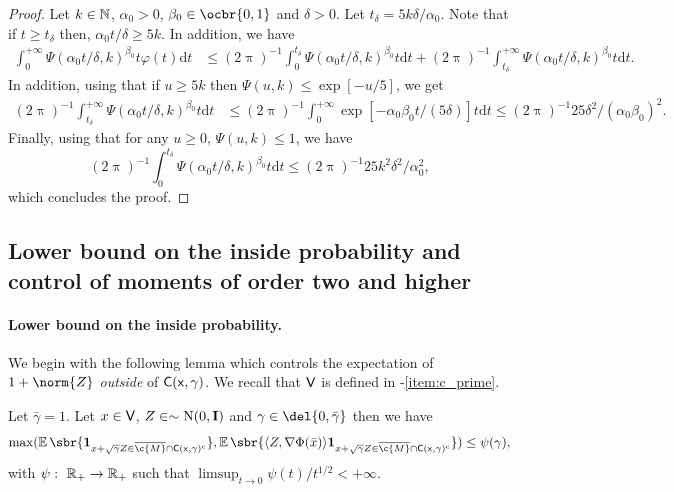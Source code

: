 \begin{proof}
	Let $k \in \mathbb{N}$, $\alpha_0 >0$, $\beta_0 \in \ocbr{0,1}$ and $\delta > 0$.
	Let $t_{\delta} = 5 k \delta /\alpha_0$.
	Note that if $t \geq t_\delta$ then, $\alpha_0 t /\delta \geq 5k$.
	In addition, we have \begin{align} \textstyle{ \int_0^{+\infty} \Psi(\alpha_0 t/\delta, k)^{\beta_0} t \varphi(t) \mathrm{d} t} & \leq (2 \uppi)^{-1} \textstyle{ \int_0^{t_\delta} \Psi(\alpha_0 t/\delta, k)^{\beta_0} t \mathrm{d} t} + (2\uppi)^{-1} \textstyle{ \int_{t_\delta}^{+\infty} \Psi(\alpha_0 t/\delta, k)^{\beta_0} t \mathrm{d} t} .
	\end{align}
	In addition, using that if $u \geq 5k$ then $\Psi(u,k) \leq \exp[-u/5]$, we get \begin{align} \textstyle (2\uppi)^{-1} \int_{t_\delta}^{+\infty} \Psi(\alpha_0 t/\delta, k)^{\beta_0} t \mathrm{d} t & \leq (2\uppi)^{-1} \textstyle \int_0^{+\infty} \exp[-\alpha_0\beta_0 t /(5\delta)] t \mathrm{d} t \leq (2\uppi)^{-1} 25 \delta^2 / (\alpha_0 \beta_0)^2 .
	\end{align}
	Finally, using that for any $u \geq 0$, $\Psi(u,k)\leq1$, we have \begin{equation} \textstyle (2 \uppi)^{-1} \textstyle{ \int_0^{t_\delta} \Psi(\alpha_0 t/\delta, k)^{\beta_0} t \mathrm{d} t} \leq (2 \uppi)^{-1} 25 k^2 \delta^2 / \alpha_0^2 , \end{equation} which concludes the proof.
\end{proof}

\subsection{Lower bound on the inside probability and control of moments of order two and higher}
\label{sec:lower_control}

\paragraph{Lower bound on the inside probability.}
We begin with the following lemma which controls the expectation of $1 + \norm{Z}$ \emph{outside} of $\sf{C}(x,\gamma)$.
We recall that $\sf{V}$ is defined in -\ref{item:c_prime}.

\begin{lemma}
	\label{lemma:control_outside}
	Let $\bar{\gamma} = 1$.
	Let $x \in \sf{V}$, $Z \in \sim \mathrm{N}(0, \m{I})$ and $\gamma \in \del{0, \bar{\gamma}}$ then we have \begin{equation} \max(\E\sbr{\bm{1}_{x + \sqrt{\gamma} Z \in \cl{\c{M}} \cap \sf{C}(x,\gamma)^\mathrm{c}}}, \E\sbr{\langle Z, \nabla \Phi(\bar{x})\rangle \bm{1}_{x + \sqrt{\gamma} Z \in \cl{\c{M}} \cap \sf{C}(x,\gamma)^\mathrm{c}}}) \leq \psi(\gamma) , \end{equation} with $\psi: \ \mathbb{R}_+ \to \mathbb{R}_+$ such that $\limsup_{t \to 0} \psi(t)/t^{1/2} < +\infty$.
\end{lemma}

